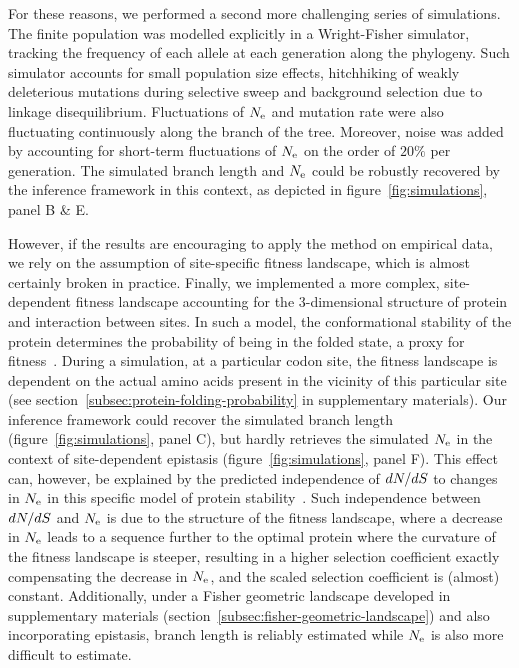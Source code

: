 For these reasons, we performed a second more challenging series of simulations.
The finite population was modelled explicitly in a Wright-Fisher simulator, tracking the frequency of each allele at each generation along the phylogeny.
Such simulator accounts for small population size effects, hitchhiking of weakly deleterious mutations during selective sweep and background selection due to linkage disequilibrium.
Fluctuations of $N_{\mathrm{e}}$ and mutation rate were also fluctuating continuously along the branch of the tree.
Moreover, noise was added by accounting for short-term fluctuations of $N_{\mathrm{e}}$ on the order of $20\%$ per generation.
The simulated branch length and $N_{\mathrm{e}}$ could be robustly recovered by the inference framework in this context, as depicted in figure~\ref{fig:simulations}, panel B \& E.

However, if the results are encouraging to apply the method on empirical data, we rely on the assumption of site-specific fitness landscape, which is almost certainly broken in practice.
Finally, we implemented a more complex, site-dependent fitness landscape accounting for the $3$-dimensional structure of protein and interaction between sites.
In such a model, the conformational stability of the protein determines the probability of being in the folded state, a proxy for fitness~\citep{Williams2006, Goldstein2011, Pollock2012}.
During a simulation, at a particular codon site, the fitness landscape is dependent on the actual amino acids present in the vicinity of this particular site (see section~\ref{subsec:protein-folding-probability} in supplementary materials).
Our inference framework could recover the simulated branch length (figure~\ref{fig:simulations}, panel C), but hardly retrieves the simulated $N_{\mathrm{e}}$ in the context of site-dependent epistasis (figure~\ref{fig:simulations}, panel F).
This effect can, however, be explained by the predicted independence of $dN/dS$ to changes in $N_{\mathrm{e}}$ in this specific model of protein stability~\citep{Goldstein2013}.
Such independence between $dN/dS$ and $N_{\mathrm{e}}$ is due to the structure of the fitness landscape, where a decrease in $N_{\mathrm{e}}$ leads to a sequence further to the optimal protein where the curvature of the fitness landscape is steeper, resulting in a higher selection coefficient exactly compensating the decrease in $N_{\mathrm{e}}$, and the scaled selection coefficient is (almost) constant.
Additionally, under a Fisher geometric landscape developed in supplementary materials (section~\ref{subsec:fisher-geometric-landscape}) and also incorporating epistasis, branch length is reliably estimated while $N_{\mathrm{e}}$ is also more difficult to estimate.

